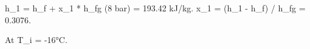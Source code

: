 h_1 = h_f + x_1 * h_fg (8 bar) = 193.42 kJ/kg.  
x_1 = (h_1 - h_f) / h_fg = 0.3076.  

At T_i = -16°C.